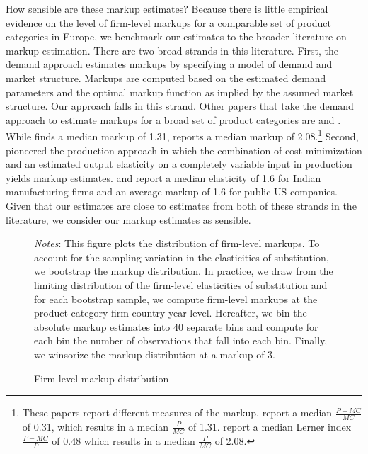 How sensible are these markup estimates? Because there is little empirical evidence on the level of firm-level markups for a comparable set of product categories in Europe, we benchmark our estimates to the broader literature on markup estimation. There are two broad strands in this literature. First, the demand approach estimates markups by specifying a model of demand and market structure. Markups are computed based on the estimated demand parameters and the optimal markup function as implied by the assumed market structure. Our approach falls in this strand. Other papers that take the demand approach to estimate markups for a broad set of product categories are \citet{Hottman2016} and \citet{Dopper2022}. While \citet{Hottman2016} finds a median markup of 1.31, \citet{Dopper2022} reports a median markup of 2.08.\footnote{These papers report different measures of the markup. \citet{Hottman2016} report a median $\frac{P-MC}{MC}$ of 0.31, which results in a median $\frac{P}{MC}$ of 1.31. \citet{Dopper2022} report a median Lerner index $\frac{P-MC}{P}$ of 0.48 which results in a median $\frac{P}{MC}$ of 2.08.} Second, \citet{Deloecker2012} pioneered the production approach in which the combination of cost minimization and an estimated output elasticity on a completely variable input in production yields markup estimates. \citet{Deloecker2016} and \citet{Deloecker2020} report a median elasticity of 1.6 for Indian manufacturing firms and an average markup of 1.6 for public US companies. Given that our estimates are close to estimates from both of these strands in the literature, we consider our markup estimates as sensible.  

\begin{figure}[H]
    \centering
    \caption{Firm-level markup distribution}
    \label{fig: struct_est_markups}
    
     \parbox{\textwidth}{
        \begin{spacing}{1} 
            {\footnotesize 
            \textit{Notes}: This figure plots the distribution of firm-level markups. To account for the sampling variation in the elasticities of substitution, we bootstrap the markup distribution. In practice, we draw from the limiting distribution of the firm-level elasticities of substitution and for each bootstrap sample, we compute firm-level markups at the product category-firm-country-year level. Hereafter, we bin the absolute markup estimates into 40 separate bins and compute for each bin the number of observations that fall into each bin. Finally, we winsorize the markup distribution at a markup of 3.}
        \end{spacing}}
 \end{figure} 


